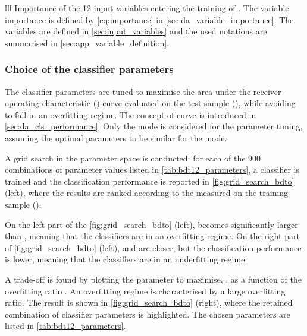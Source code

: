 {lll}
{}
{Importance of the 12 input variables entering the training of \bdto.
The variable importance is defined by \cref{eq:importance} in \cref{sec:da_variable_importance}.
The variables are defined in \cref{sec:input_variables} and the used notations are summarised in \cref{sec:app_variable_definition}.
}
\subsubsection*{Choice of the classifier parameters}
The classifier parameters are tuned to maximise the area under the receiver-operating-characteristic (\ROC) curve evaluated on the test sample (\auctest), while avoiding to fall in an overfitting regime.
The concept of \ROC curve is introduced in \cref{sec:da_cls_performance}. 
Only the \BKpnn mode is considered for the parameter tuning, assuming the optimal parameters to be similar for the \BKznn mode.

A grid search in the parameter space is conducted: for each of the 900 combinations of parameter values listed in \cref{tab:bdt12_parameters}, a classifier is trained and the classification performance is reported in \cref{fig:grid_search_bdto} (left), where the results are ranked according to the \auc measured on the training sample (\auctrain).


On the left part of the \cref{fig:grid_search_bdto} (left), \auctrain becomes significantly larger than \auctest, meaning that the classifiers are in an overfitting regime.
On the right part of \cref{fig:grid_search_bdto} (left), \auctrain and \auctest are closer, but the classification performance is lower, meaning that the classifiers are in an underfitting regime.

A trade-off is found by plotting the parameter to maximise, \auctest, as a function of the overfitting ratio
\be
{}.
\ee
An overfitting regime is characterised by a large overfitting ratio.
The result is shown in \cref{fig:grid_search_bdto} (right), where the retained combination of classifier parameters is highlighted.
The chosen parameters are listed in \cref{tab:bdt12_parameters}.

